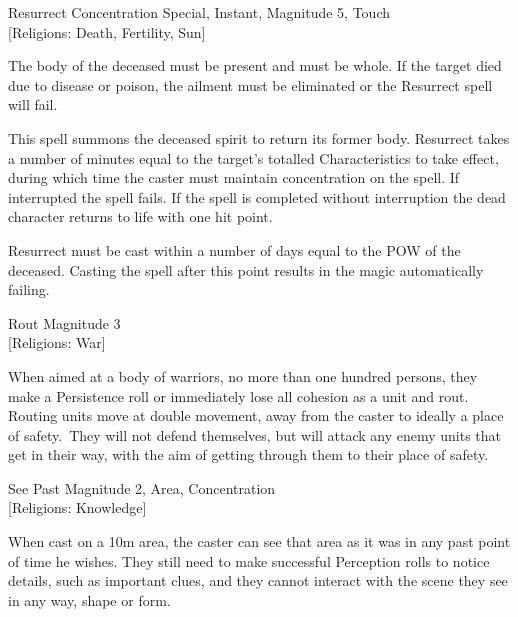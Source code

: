 \begin{rpg-spell}
{Resurrect}
{Concentration Special, Instant, Magnitude 5, Touch\\{[Religions: Death, Fertility, Sun]}}

The body of the deceased must be present and must be whole. If the target died due to disease or poison, the ailment must be eliminated or the Resurrect spell will fail. 

This spell summons the deceased spirit to return its former body. Resurrect takes a number of minutes equal to the target’s totalled Characteristics to take effect, during which time the caster must maintain concentration on the spell. If interrupted the spell fails. If the spell is completed without interruption the dead character returns to life with one hit point.

Resurrect must be cast within a number of days equal to the POW of the deceased. Casting the spell after this point results in the magic automatically failing. 
\end{rpg-spell}

\begin{rpg-spell}
{Rout}
{Magnitude 3\\{[Religions: War]}}

When aimed at a body of warriors, no more than one hundred persons, they make a Persistence roll or immediately lose all cohesion as a unit and rout. Routing units move at double movement, away from the caster to ideally a place of safety. They will not defend themselves, but will attack any enemy units that get in their way, with the aim of getting through them to their place of safety.  
\end{rpg-spell}

\begin{rpg-spell}
{See Past}
{Magnitude 2, Area, Concentration\\{[Religions: Knowledge]}}

When cast on a 10m area, the caster can see that area as it was in any past point of time he wishes. They still need to make successful Perception rolls to notice details, such as important clues, and they cannot interact with the scene they see in any way, shape or form.
\end{rpg-spell}

